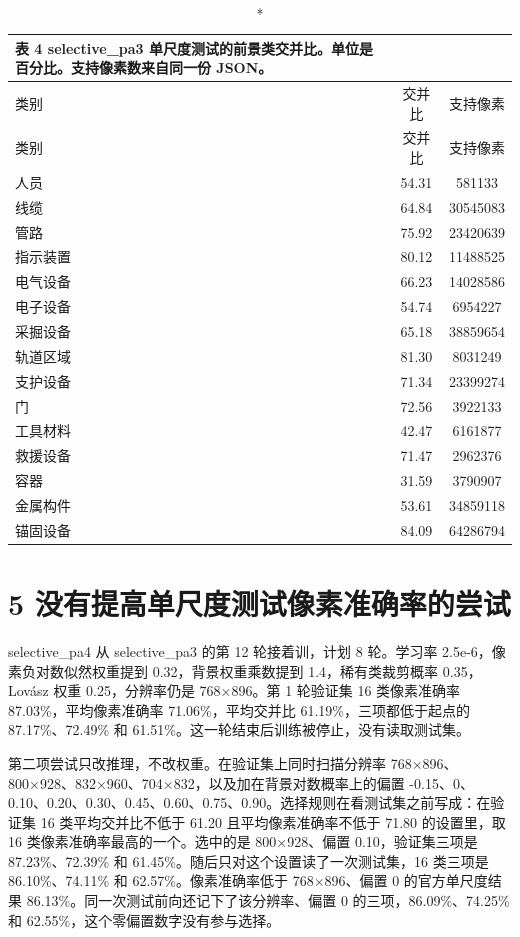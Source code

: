 \documentclass[11pt]{article}
\begin{document}
{\footnotesize\setlength{\tabcolsep}{3pt}
\begin{longtable}{lcc}
\caption*{表 4  selective\_pa3 单尺度测试的前景类交并比。单位是百分比。支持像素数来自同一份 JSON。}\\
\toprule
类别 & 交并比 & 支持像素\\
\midrule
\endfirsthead
\toprule
类别 & 交并比 & 支持像素\\
\midrule
\endhead
人员 & 54.31 & 581133\\
线缆 & 64.84 & 30545083\\
管路 & 75.92 & 23420639\\
指示装置 & 80.12 & 11488525\\
电气设备 & 66.23 & 14028586\\
电子设备 & 54.74 & 6954227\\
采掘设备 & 65.18 & 38859654\\
轨道区域 & 81.30 & 8031249\\
支护设备 & 71.34 & 23399274\\
门 & 72.56 & 3922133\\
工具材料 & 42.47 & 6161877\\
救援设备 & 71.47 & 2962376\\
容器 & 31.59 & 3790907\\
金属构件 & 53.61 & 34859118\\
锚固设备 & 84.09 & 64286794\\
\bottomrule
\end{longtable}
}
\section*{5  没有提高单尺度测试像素准确率的尝试}
selective\_pa4 从 selective\_pa3 的第 12 轮接着训，计划 8 轮。学习率 2.5e-6，像素负对数似然权重提到 0.32，背景权重乘数提到 1.4，稀有类裁剪概率 0.35，Lovász 权重 0.25，分辨率仍是 768×896。第 1 轮验证集 16 类像素准确率 87.03\%，平均像素准确率 71.06\%，平均交并比 61.19\%，三项都低于起点的 87.17\%、72.49\% 和 61.51\%。这一轮结束后训练被停止，没有读取测试集。

第二项尝试只改推理，不改权重。在验证集上同时扫描分辨率 768×896、800×928、832×960、704×832，以及加在背景对数概率上的偏置 -0.15、0、0.10、0.20、0.30、0.45、0.60、0.75、0.90。选择规则在看测试集之前写成：在验证集 16 类平均交并比不低于 61.20 且平均像素准确率不低于 71.80 的设置里，取 16 类像素准确率最高的一个。选中的是 800×928、偏置 0.10，验证集三项是 87.23\%、72.39\% 和 61.45\%。随后只对这个设置读了一次测试集，16 类三项是 86.10\%、74.11\% 和 62.57\%。像素准确率低于 768×896、偏置 0 的官方单尺度结果 86.13\%。同一次测试前向还记下了该分辨率、偏置 0 的三项，86.09\%、74.25\% 和 62.55\%，这个零偏置数字没有参与选择。
\end{document}
